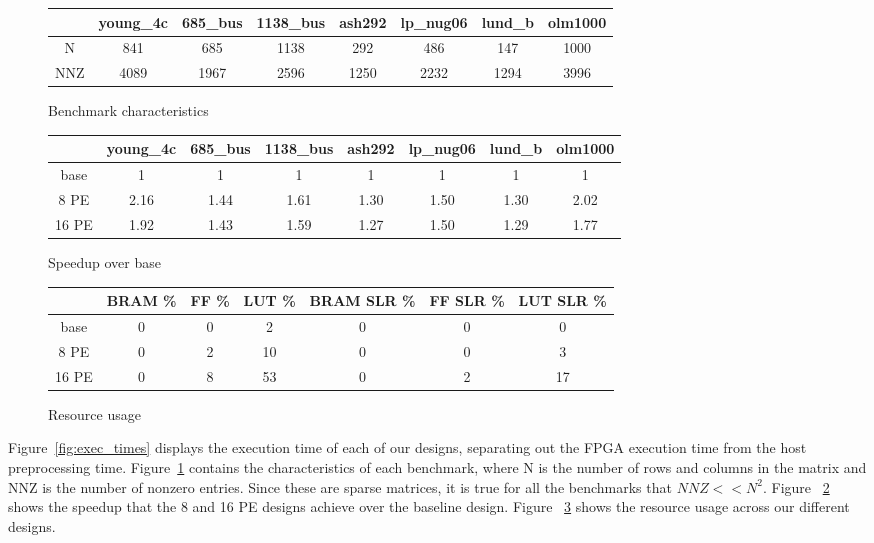 \documentclass[10pt]{article}
\begin{document}
\begin{figure}[h!]
  \centering
  \begin{tabular} {| c | c | c | c | c | c | c | c |}
    \hline
         & young\_4c & 685\_bus & 1138\_bus & ash292 & lp\_nug06 & lund\_b & olm1000 \\
    \hline
    N    & 841       & 685      & 1138      & 292    & 486       & 147     & 1000 \\
    \hline
    NNZ  & 4089      & 1967     &  2596     & 1250   & 2232      & 1294    & 3996 \\
    \hline
  \end{tabular}
  \caption{Benchmark characteristics}
  \label{fig:bench_info}
\end{figure}

\begin{figure}[h!]
  \centering
  \begin{tabular} {| c | c | c | c | c | c | c | c |}
    \hline
                    & young\_4c & 685\_bus & 1138\_bus & ash292 & lp\_nug06 & lund\_b & olm1000 \\
    \hline
    base            & 1         & 1        & 1         & 1      & 1         & 1       & 1       \\
    \hline
    8 PE            & 2.16      & 1.44     & 1.61      & 1.30   & 1.50      & 1.30    & 2.02 \\
    \hline
    16 PE           & 1.92      & 1.43     & 1.59      & 1.27   & 1.50      & 1.29    & 1.77 \\
    \hline    
  \end{tabular}
  \caption{Speedup over base}
  \label{fig:speedups}
\end{figure}

\begin{figure}[h!]
  \centering
  \begin{tabular} {| c | c | c | c | c | c | c |}
    \hline
          & BRAM \% & FF \% & LUT \% & BRAM SLR \% & FF SLR \% & LUT SLR \% \\
    \hline
    base  & 0 & 0 & 2 & 0 & 0 & 0 \\
    \hline
    8 PE  & 0 & 2 & 10 & 0 & 0 & 3 \\
    \hline
    16 PE & 0 & 8 & 53 & 0 & 2 & 17 \\
    \hline
  \end{tabular}
  \caption{Resource usage}
  \label{fig:resources}
\end{figure}

Figure~\ref{fig:exec_times} displays the execution time of each of our designs, separating out the FPGA execution time from
the host preprocessing time. Figure~\ref{fig:bench_info} contains the characteristics of each benchmark, where N is the number of
rows and columns in the matrix and NNZ is the number of nonzero entries. Since these are sparse matrices, it is true for all the
benchmarks that $\mathit{NNZ} << N^2$. Figure ~\ref{fig:speedups} shows the speedup that the 8 and 16 PE designs achieve over
the baseline design. Figure ~\ref{fig:resources} shows the resource usage across our different designs.
\end{document}
